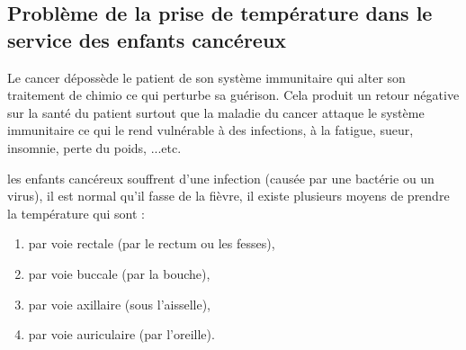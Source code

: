 \documentclass[12pt]{article}
\begin{document}
\subsection{Problème de la prise de température dans le service des enfants cancéreux}
Le cancer dépossède le patient de son système immunitaire qui alter son traitement de chimio ce qui perturbe sa guérison. Cela produit un retour négative sur la santé du patient surtout que la maladie du cancer attaque le système immunitaire ce qui le rend vulnérable à des infections, à la fatigue, sueur, insomnie, perte du poids, ...etc.

les enfants cancéreux souffrent d’une infection (causée par une bactérie ou un virus), il est normal qu’il fasse de la fièvre, il existe plusieurs moyens de prendre la température qui sont :
\begin{enumerate}
	\item par voie rectale (par le rectum ou les fesses),
	\item par voie buccale (par la bouche),
	\item par voie axillaire (sous l’aisselle),
	\item par voie auriculaire (par l’oreille).
\end{enumerate}
\end{document}
